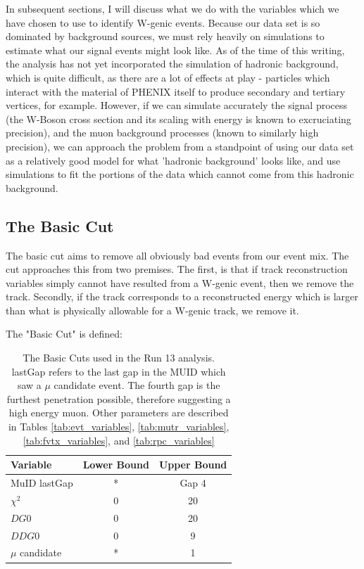 In subsequent sections, I will discuss what we do with the variables which we
have chosen to use to identify W-genic events. Because our data set is so
dominated by background sources, we must rely heavily on simulations to estimate
what our signal events might look like. As of the time of this writing, the
analysis has not yet incorporated the simulation of hadronic background, which
is quite difficult, as there are a lot of effects at play - particles which
interact with the material of PHENIX itself to produce secondary and tertiary
vertices, for example. However, if we can simulate accurately the signal process
(the W-Boson cross section and its scaling with energy is known to excruciating
precision), and the muon background processes (known to similarly high
precision), we can approach the problem from a standpoint of using our data set
as a relatively good model for what 'hadronic background' looks like, and use
simulations to fit the portions of the data which cannot come from this hadronic
background. 

\clearpage
\subsection{The Basic Cut}

The basic cut aims to remove all obviously bad events from our event mix. The
cut approaches this from two premises. The first, is that if track
reconstruction variables simply cannot have resulted from a W-genic event, then
we remove the track. Secondly, if the track corresponds to a reconstructed
energy which is larger than what is physically allowable for a W-genic track, we
remove it.

The "Basic Cut" is defined:
\begin{table}[ht]
  \centering
  \begin{tabular}{l c c}
    \toprule
    \textbf{Variable} & \textbf{Lower Bound} & \textbf{Upper Bound} \\
    \midrule
    MuID lastGap & * & Gap 4 \\ 
    $\chi^2$ & 0 & 20 \\
    $DG0$ & 0 & 20 \\
    $DDG0$ & 0 & 9 \\
    $\mu$ candidate & * & 1 \\
    \bottomrule
  \end{tabular}
  \caption{ The Basic Cuts used in the Run 13 analysis. lastGap refers to the
    last gap in the MUID which saw a $\mu$ candidate event. The fourth gap is
    the furthest penetration possible, therefore suggesting a high energy muon.
    Other parameters are described in Tables \ref{tab:evt_variables}, 
    \ref{tab:mutr_variables}, \ref{tab:fvtx_variables}, and
    \ref{tab:rpc_variables}
  }
  \label{tab:basic_cut}
\end{table}

